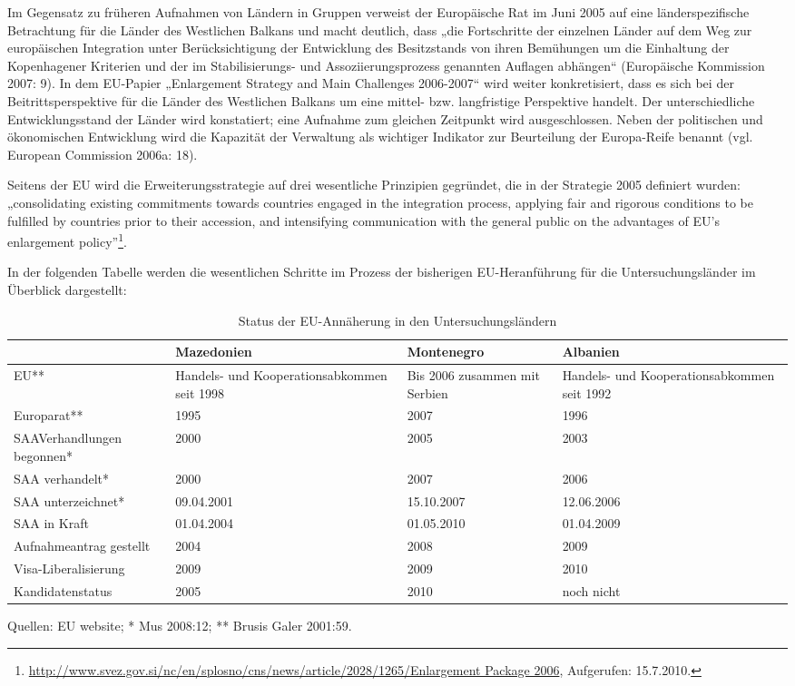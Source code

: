 Im Gegensatz zu früheren Aufnahmen von Ländern in Gruppen verweist der Europäische Rat im Juni 2005 auf eine länderspezifische Betrachtung für die Länder des Westlichen Balkans und macht deutlich, dass „die Fortschritte der einzelnen Länder auf dem Weg zur europäischen Integration unter Berücksichtigung der Entwicklung des Besitzstands von ihren Bemühungen um die Einhaltung der Kopenhagener Kriterien und der im Stabilisierungs- und Assoziierungsprozess genannten Auflagen abhängen“ (Europäische Kommission 2007: 9). In dem EU-Papier „Enlargement Strategy and Main Challenges 2006-2007“ wird weiter konkretisiert, dass es sich bei der Beitrittsperspektive für die Länder des Westlichen Balkans um eine mittel- bzw. langfristige Perspektive handelt. Der unterschiedliche Entwicklungsstand der Länder wird konstatiert; eine Aufnahme zum gleichen Zeitpunkt wird ausgeschlossen. Neben der politischen und ökonomischen Entwicklung wird die Kapazität der Verwaltung als wichtiger Indikator zur Beurteilung der Europa-Reife benannt (vgl. European Commission 2006a: 18).\par
Seitens der EU wird die Erweiterungsstrategie auf drei wesentliche Prinzipien gegründet, die in der Strategie 2005 definiert wurden: „consolidating existing commitments towards countries engaged in the integration process, applying fair and rigorous conditions to be fulfilled by countries prior to their accession, and intensifying communication with the general public on the advantages of EU’s enlargement policy”\footnote{\url{	http://www.svez.gov.si/nc/en/splosno/cns/news/article/2028/1265/Enlargement Package 2006}, Aufgerufen: 15.7.2010.}.\par

In der folgenden Tabelle werden die wesentlichen Schritte im Prozess der bisherigen EU-Heranführung für die Untersuchungsländer im Überblick dargestellt:
\begin{table}[H]
\caption{ Status der EU-Annäherung in den Untersuchungsländern}
\begin{tabular}{|L{ 3,5cm}|L{3,5cm}|L{3,5cm}|L{3,5cm}|}\hline
&Mazedonien&
Montenegro&
Albanien\\\hline
EU**&
Handels- und Koopera\-tions\-abkommen seit 1998&
Bis 2006 zusammen mit Serbien&
Handels- und Kooperations\-abkommen seit 1992\\\hline
Europarat**&
1995&
2007&
1996\\\hline
SAAVerhandlungen begonnen*&
2000&
2005&
2003\\\hline
SAA verhandelt*&
2000&
2007&
2006\\\hline
SAA unterzeichnet*&
09.04.2001&
15.10.2007&
12.06.2006\\\hline
SAA in Kraft&
01.04.2004&
01.05.2010&
01.04.2009\\\hline
Aufnahmeantrag gestellt&
2004&
2008&
2009\\\hline
Visa-Liberalisierung&
2009&
2009&
2010\\\hline
Kandidatenstatus&
2005&
2010&
noch nicht\\\hline
\end{tabular}
\end{table}
Quellen: EU website; * Mus 2008:12; ** Brusis Galer 2001:59. 



